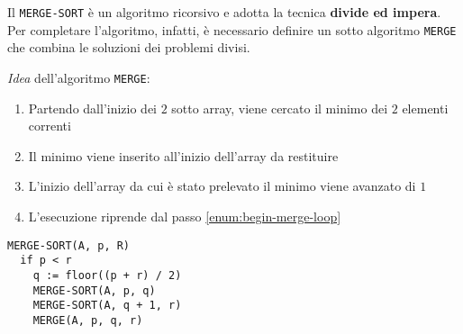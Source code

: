 \documentclass[italian, 10pt]{article}
\begin{document}
Il \texttt{MERGE-SORT} è un algoritmo ricorsivo e adotta la tecnica \textbf{divide ed impera}.
Per completare l'algoritmo, infatti, è necessario definire un sotto algoritmo \texttt{MERGE} che combina le soluzioni dei problemi divisi.

\textit{Idea} dell'algoritmo \texttt{MERGE}:

\begin{enumerate}
  \item \label{enum:begin-merge-loop} Partendo dall'inizio dei \(2\) sotto array, viene cercato il minimo dei \(2\) elementi correnti
  \item Il minimo viene inserito all'inizio dell'array da restituire
  \item L'inizio dell'array da cui è stato prelevato il minimo viene avanzato di \(1\)
  \item L'esecuzione riprende dal passo \ref{enum:begin-merge-loop}
\end{enumerate}

\begin{lstlisting}[style=pseudocode, caption={Pseudocodice dell'algoritmo \texttt{MERGE-SORT}}, label={lst:pseudocodice-merge-sort}]
MERGE-SORT(A, p, R)
  if p < r
    q := floor((p + r) / 2)
    MERGE-SORT(A, p, q)
    MERGE-SORT(A, q + 1, r)
    MERGE(A, p, q, r)
\end{lstlisting}
\end{document}
